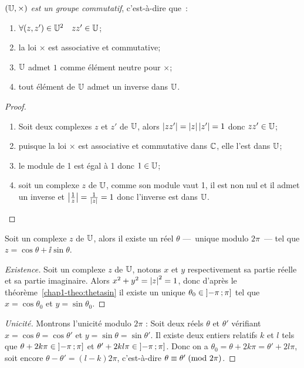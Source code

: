 \begin{prop}
    \emph{\((\mathbb{U}, \times)\) est un groupe commutatif}, c'est-à-dire que~:
    \begin{enumerate}
        \item \(\forall (z,z') \in \mathbb{U}^2 \quad zz' \in \mathbb{U}\);
        \item la loi \(\times\) est associative et commutative;
        \item \(\mathbb{U}\) admet \(1\) comme élément neutre pour \(\times\);
        \item tout élément de \(\mathbb{U}\) admet un inverse dans \(\mathbb{U}\).
    \end{enumerate}
\end{prop}

\begin{proof}
    \begin{enumerate}
        \item Soit deux complexes \(z\) et \(z'\) de \(\mathbb{U}\), alors \(\left\lvert zz'\right\rvert = 
            \left\lvert z\right\rvert\left\lvert z'\right\rvert = 1\) donc \(zz' \in \mathbb{U}\);
        \item puisque la loi \(\times\) est associative et commutative dans 
            \(\mathbb{C}\), elle l'est dans \(\mathbb{U}\);
        \item le module de 1 est égal à 1 donc \(1 \in \mathbb{U}\);
        \item soit un complexe \(z\) de \(\mathbb{U}\), comme son module vaut 1, il est 
            non nul et il admet un inverse et \(\left\lvert\frac{1}{z}\right\rvert = 
            \frac{1}{\left\lvert z\right\rvert} = 1\) donc l'inverse est dans \(\mathbb{U}\).
    \end{enumerate}
\end{proof}

\begin{prop}
    \label{prop:expsurj}
    Soit un complexe \(z\) de \(\mathbb{U}\), alors il existe un réel \(\theta\) 
    ---~unique modulo \(2\pi\)~--- tel que \(z = \cos\theta  + 
    \ii\sin\theta\).
\end{prop}

\begin{proof}[Existence]
    Soit un complexe \(z\) de \(\mathbb{U}\), notons \(x\) et \(y\) respectivement sa 
    partie réelle et sa partie imaginaire. Alors \(x^2 + y^2 = \left\lvert z\right\rvert^2 = 1\), 
    donc d'après le théorème~\ref{chap1-theo:thetasin} il existe un unique 
    \(\theta_0 \in \left] -\pi \, ;  \pi \right]\) tel que \(x = \cos\theta_0\) et 
    \(y = \sin\theta_0\).
\end{proof}

\begin{proof}[Unicité]
    Montrons l'unicité modulo \(2\pi\) : Soit deux réels \(\theta\) et 
    \(\theta'\) vérifiant  \(x = \cos \theta = \cos \theta'\) et \(y = \sin 
    \theta = \sin \theta'\). Il existe deux entiers relatifs \(k\) et \(l\) tels 
    que \(\theta  + 2k \pi \in \left] -\pi \, ;  \pi \right]\) et \(\theta'  + 2kl 
    \pi \in \left] -\pi \, ;  \pi \right]\). Donc on a \(\theta_0 = \theta + 2k \pi = 
    \theta' + 2l \pi\), soit encore \(\theta-\theta' = (l-k) 2\pi\), 
    c'est-à-dire \(\theta \equiv \theta'\!\pmod {2\pi}\).
\end{proof}

